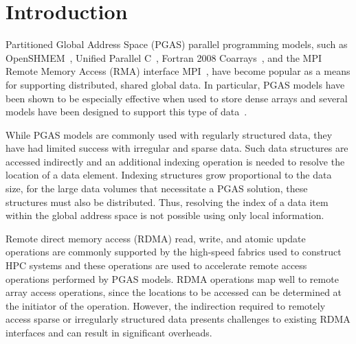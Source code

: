\section{Introduction}

Partitioned Global Address Space (PGAS) parallel programming models, such as
OpenSHMEM~\cite{openshmem-1.3}, Unified Parallel C~\cite{upc-13-spec}, Fortran
2008 Coarrays~\cite{reid:08,fortran-2008}, and the MPI Remote Memory Access
(RMA) interface MPI~\cite{mpi-forum:15}, have become popular as a means for
supporting distributed, shared global data.  In particular, PGAS models have
been shown to be especially effective when used to store dense arrays and
several models have been designed to support this type of
data~\cite{ga,kamil:14,ddi,niu:16}.

While PGAS models are commonly used with regularly structured data, they have
had limited success with irregular and sparse data.  Such data structures are
accessed indirectly and an additional indexing operation is needed to resolve
the location of a data element.  Indexing structures grow proportional to the
data size, for the large data volumes that necessitate a PGAS solution, these
structures must also be distributed.  Thus, resolving the index of a data item
within the global address space is not possible using only local information.

Remote direct memory access (RDMA) read, write, and atomic update operations
are commonly supported by the high-speed fabrics used to construct HPC systems
and these operations are used to accelerate remote access operations performed
by PGAS models.  RDMA operations map well to remote array access operations,
since the locations to be accessed can be determined at the initiator of the
operation.  However, the indirection required to remotely access sparse or
irregularly structured data presents challenges to existing RDMA interfaces
and can result in significant overheads.




